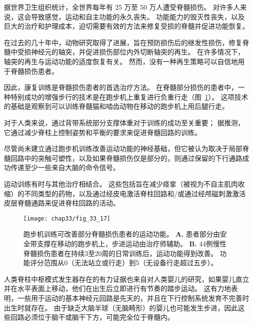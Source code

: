 \begin{proposition}[康复训练可改善人类脊髓损伤后的行走] \label{box:33_4}
	
	\quad \quad 据世界卫生组织统计，全世界每年有 25 万至 50 万人遭受脊髓损伤。
	对许多人来说，这会导致感觉，运动和自主功能的永久丧失。
	功能能力的毁灭性丧失，以及巨大的治疗和护理成本，迫切需要有效的方法来修复受损的脊髓并促进功能恢复。
	
	\quad \quad 在过去的几十年中，动物研究取得了进展，旨在预防损伤后的继发性损伤，修复脊髓中受损神经元的轴突，并促进损伤部位内外切断轴突的再生。
	在许多情况下，轴突的再生与运动功能的适度恢复有关。
	然而，没有一种再生策略可以自信地用于脊髓损伤患者。
	
	\quad \quad 因此，康复训练是脊髓损伤患者的首选治疗方法。
	在脊髓部分损伤的患者中，一种特别成功的增强步行的技术是在跑步机上重复进行负重行走（图~\ref{fig:33_17}）。
	这项技术的基础是观察到可以训练脊髓猫和啮齿动物在移动的跑步机上用后腿行走。
	
	\quad \quad 对于人类来说，通过背带系统部分支撑体重对于训练的成功至关重要；
	据推测，它通过减少脊柱上控制姿势和平衡的要求来促进脊髓回路的训练。
	
	\quad \quad 尽管尚未建立通过跑步机训练改善运动功能的神经基础，但它被认为取决于局部脊髓回路中的突触可塑性，以及如果脊髓损伤仅是部分的，则通过保留的下行通路成功传递至少一些来自大脑的命令信号。
	
	\quad \quad 运动训练有时与其他治疗相结合。
	这些包括旨在减少痉挛（被视为不自主肌肉收缩）的不同类型的药物，以及通过经皮电激活脊柱回路和/或通过经颅磁刺激激活皮层脊髓通路来促进脊柱回路的活动。
	
\end{proposition}


\begin{figure}[htbp]
	\centering
	\texttt{[image: chap33/fig\_33\_17]}
	\caption{跑步机训练可改善部分脊髓损伤患者的运动功能。
		\textbf{A.} 患者部分由安全带支撑在移动的跑步机上，步进运动由治疗师辅助。
		\textbf{B.} 44例慢性脊髓损伤患者在持续3至20周的日常训练后，运动功能得到改善。
		功能评分范围从0（无法站立或行走）到5（无设备行走超过五步）\cite{wernig1995laufband}。}
	\label{fig:33_17}
\end{figure}


人类脊柱中枢模式发生器存在的有力证据也来自对人类婴儿的研究，如果婴儿直立并在水平表面上移动，他们在出生后立即进行有节奏的踏步运动。
这有力地表明，一些用于运动的基本神经元回路是先天的，并且在下行控制系统发育不完善时出生时就存在。
由于缺乏大脑半球（无脑畸形）的婴儿也可能发生步进，因此这些回路必须位于脑干或脑干下方，可能完全位于脊髓内。


